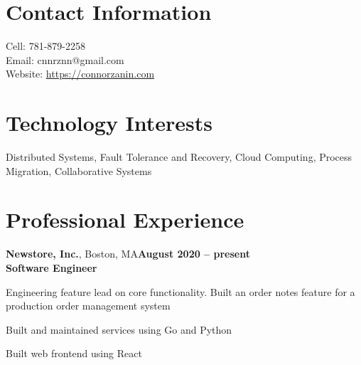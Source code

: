 \documentclass[margin,line]{resume}
\newif\ifReferences
\newif\ifOnline
\begin{document}
\Referencesfalse
\Onlinefalse


\begin{resume}


\section{\mysidestyle Contact Information}
\ifOnline
	Email: cnnrznn@gmail.com	 							\hfill Boston, MA\\
\else
   	\mbox{} \hfill Cell: 781-879-2258\\
   	\mbox{} \hfill Email: cnnrznn@gmail.com\\
    \mbox{} \hfill Website: \url{https://connorzanin.com}\\
\fi
   




\section{\mysidestyle Technology Interests}
Distributed Systems, Fault Tolerance and Recovery, Cloud Computing, Process Migration, Collaborative Systems




\section{\mysidestyle Professional Experience}
\textbf{Newstore, Inc.}, Boston, MA\hfill\textbf{August 2020 -- present}\\
\textbf{Software Engineer}\hfill
\vspace{-3mm}\\\vspace{-1mm}
\begin{list2}
    \item Engineering feature lead on core functionality. Built an order notes feature for a production order management system
	\item Built and maintained services using Go and Python
    \item Built web frontend using React
\end{list2}


\end{resume}
\end{document}
